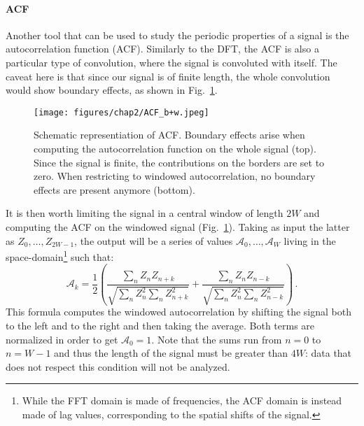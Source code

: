 \paragraph{ACF}
Another tool that can be used to study the periodic properties of a signal is the autocorrelation function (ACF). Similarly to the DFT, the ACF is also a particular type of convolution, where the signal is convoluted with itself. The caveat here is that since our signal is of finite length, the whole convolution would show boundary effects, as shown in Fig.\ \ref{fig:ACF_b+w}.
\begin{figure}[ht!]
    \centering
    \texttt{[image: figures/chap2/ACF\_b+w.jpeg]}
    \caption{Schematic representiation of ACF. Boundary effects arise when computing the autocorrelation function on the whole signal (top). Since the signal is finite, the contributions on the borders are set to zero. When restricting to windowed autocorrelation, no boundary effects are present anymore (bottom).}
    \label{fig:ACF_b+w}
\end{figure}
It is then worth limiting the signal in a central window of length $2W$ and computing the ACF on the windowed signal (Fig.\ \ref{fig:ACF_b+w}). Taking as input the latter as $Z_0,\dots,Z_{2W-1}$, the output will be a series of values $\mathcal{A}_0,\dots,\mathcal{A}_{W}$ living in the space-domain\footnote{While the FFT domain is made of frequencies, the ACF domain is instead made of lag values, corresponding to the spatial shifts of the signal.} such that:
\begin{equation*}
    \mathcal{A}_k = \frac{1}{2} \left( \frac{\sum_{n} Z_n Z_{n+k}}{\sqrt{\sum_{n} Z_n^2 \sum_{n} Z_{n+k}^2}} + \frac{\sum_{n} Z_n Z_{n-k}}{\sqrt{\sum_{n} Z_n^2 \sum_{n} Z_{n-k}^2}} \right)\, .
\end{equation*}
This formula computes the windowed autocorrelation by shifting the signal both to the left and to the right and then taking the average.
Both terms are normalized in order to get $\mathcal{A}_0 = 1$. 
Note that the sums run from $n = 0$ to $n = W-1$ and thus the length of the signal must be greater than $4W$: data that does not respect this condition will not be analyzed.

